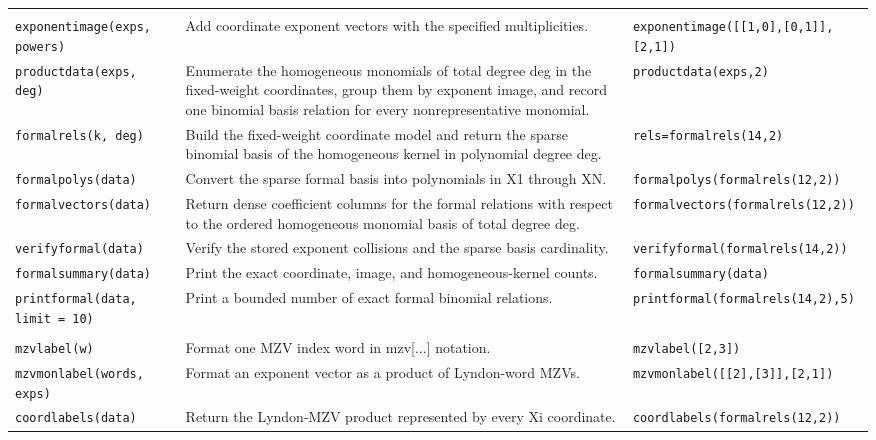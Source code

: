 \documentclass[12pt]{amsproc}
\newcommand{\code}[1]{\nolinkurl{#1}}
\begin{document}
\begin{longtable}{@{}L{0.245\textwidth}L{0.440\textwidth}L{0.245\textwidth}@{}}
\addlinespace[2pt]
\addlinespace[3pt]\\[2pt]
\code{exponentimage(exps, powers)} & Add coordinate exponent vectors with the specified multiplicities. & \code{exponentimage([[1,0],[0,1]],[2,1])} \\
\addlinespace[2pt]
\code{productdata(exps, deg)} & Enumerate the homogeneous monomials of total degree deg in the fixed-weight coordinates, group them by exponent image, and record one binomial basis relation for every nonrepresentative monomial. & \code{productdata(exps,2)} \\
\addlinespace[2pt]
\code{formalrels(k, deg)} & Build the fixed-weight coordinate model and return the sparse binomial basis of the homogeneous kernel in polynomial degree deg. & \code{rels=formalrels(14,2)} \\
\addlinespace[2pt]
\code{formalpolys(data)} & Convert the sparse formal basis into polynomials in X1 through XN. & \code{formalpolys(formalrels(12,2))} \\
\addlinespace[2pt]
\code{formalvectors(data)} & Return dense coefficient columns for the formal relations with respect to the ordered homogeneous monomial basis of total degree deg. & \code{formalvectors(formalrels(12,2))} \\
\addlinespace[2pt]
\code{verifyformal(data)} & Verify the stored exponent collisions and the sparse basis cardinality. & \code{verifyformal(formalrels(14,2))} \\
\addlinespace[2pt]
\code{formalsummary(data)} & Print the exact coordinate, image, and homogeneous-kernel counts. & \code{formalsummary(data)} \\
\addlinespace[2pt]
\code{printformal(data, limit = 10)} & Print a bounded number of exact formal binomial relations. & \code{printformal(formalrels(14,2),5)} \\
\addlinespace[2pt]
\addlinespace[3pt]\\[2pt]
\code{mzvlabel(w)} & Format one MZV index word in mzv[...] notation. & \code{mzvlabel([2,3])} \\
\addlinespace[2pt]
\code{mzvmonlabel(words, exps)} & Format an exponent vector as a product of Lyndon-word MZVs. & \code{mzvmonlabel([[2],[3]],[2,1])} \\
\addlinespace[2pt]
\code{coordlabels(data)} & Return the Lyndon-MZV product represented by every Xi coordinate. & \code{coordlabels(formalrels(12,2))} \\

\end{longtable}
\end{document}
